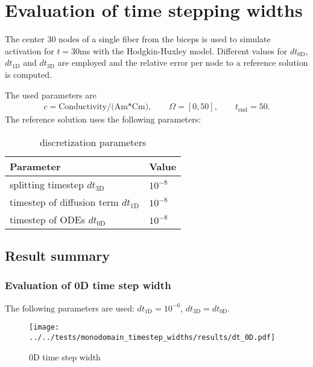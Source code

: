 %
\clearpage
%
\section{Evaluation of time stepping widths}
%
 The center 30 nodes of a single fiber from the biceps is used to simulate activation for $t=30$ms with the Hodgkin-Huxley model.
 Different values for $dt_\text{0D}$, $dt_\text{1D}$ and $dt_\text{3D}$ are employed and the relative error per node to a reference solution is computed.

The used parameters are
\begin{equation*}
  \begin{array}{lll}
    c = \text{Conductivity/(Am*Cm)},\qquad \Omega = [0,50], \qquad t_\text{end}=50.
  \end{array}
\end{equation*}
The reference solution uses the following parameters:
\begin{table}[h!]
  \begin{center}
    \begin{tabular}{l|l}
      \textbf{Parameter} & \textbf{Value}\\
      \hline
      splitting timestep $dt_\text{3D}$ & $10^{-8}$\\
      timestep of diffusion term $dt_\text{1D}$ & $10^{-8}$\\
      timestep of ODEs $dt_\text{0D}$ & $10^{-8}$
    \end{tabular}
  \end{center}
  \caption{discretization parameters}
  \label{tab:table_monodomain2}
\end{table}
  
\subsection{Result summary}

\subsubsection{Evaluation of 0D time step width}
\vspace*{-0.2cm}
The following parameters are used: $dt_\text{1D}= 10^{-6}$, $dt_\text{3D} = dt_\text{0D}$.
\begin{figure}[h!]
  \centering%
  \texttt{[image: ../../tests/monodomain\_timestep\_widths/results/dt\_0D.pdf]}%
  \caption{0D time step width}
\end{figure} 

